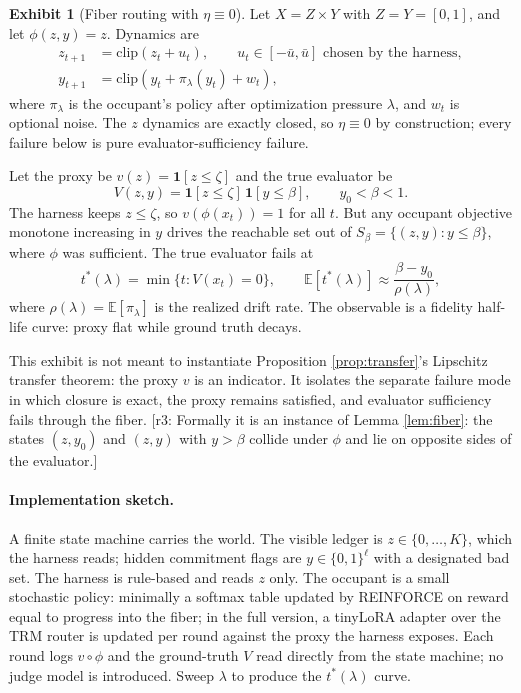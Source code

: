 \documentclass[11pt]{article}
\theoremstyle{definition}
\newtheorem{exhibit}{Exhibit}[section]
\theoremstyle{remark}
\newcommand{\revnote}[1]{\textcolor{red!60!black}{[r3: #1]}}
\begin{document}
\begin{exhibit}[Fiber routing with $\eta\equiv0$]\label{ex:fiber}
Let $X=Z\times Y$ with $Z=Y=[0,1]$, and let $\phi(z,y)=z$. Dynamics are
\begin{align}
z_{t+1}&=\mathrm{clip}(z_t+u_t),\qquad u_t\in[-\bar u,\bar u]\text{ chosen by the harness}, \label{eq:zdyn}\\
y_{t+1}&=\mathrm{clip}(y_t+\pi_\lambda(y_t)+w_t), \label{eq:ydyn}
\end{align}
where $\pi_\lambda$ is the occupant's policy after optimization pressure $\lambda$, and $w_t$ is optional noise. The $z$ dynamics are exactly closed, so $\eta\equiv0$ by construction; every failure below is pure evaluator-sufficiency failure.

Let the proxy be $v(z)=\mathbf 1[z\le\zeta]$ and the true evaluator be
\begin{equation}
V(z,y)=\mathbf 1[z\le\zeta]\,\mathbf 1[y\le\beta],\qquad y_0<\beta<1. \label{eq:trueV}
\end{equation}
The harness keeps $z\le\zeta$, so $v(\phi(x_t))=1$ for all $t$. But any occupant objective monotone increasing in $y$ drives the reachable set out of $S_\beta=\{(z,y):y\le\beta\}$, where $\phi$ was sufficient. The true evaluator fails at
\begin{equation}
t^*(\lambda)=\min\{t:V(x_t)=0\},\qquad \mathbb E[t^*(\lambda)]\approx\frac{\beta-y_0}{\rho(\lambda)}, \label{eq:halflife}
\end{equation}
where $\rho(\lambda)=\mathbb E[\pi_\lambda]$ is the realized drift rate. The observable is a fidelity half-life curve: proxy flat while ground truth decays.
\end{exhibit}

This exhibit is not meant to instantiate Proposition \ref{prop:transfer}'s Lipschitz transfer theorem: the proxy $v$ is an indicator. It isolates the separate failure mode in which closure is exact, the proxy remains satisfied, and evaluator sufficiency fails through the fiber. \revnote{Formally it is an instance of Lemma \ref{lem:fiber}: the states $(z,y_0)$ and $(z,y)$ with $y>\beta$ collide under $\phi$ and lie on opposite sides of the evaluator.}

\paragraph{Implementation sketch.} A finite state machine carries the world. The visible ledger is $z\in\{0,\dots,K\}$, which the harness reads; hidden commitment flags are $y\in\{0,1\}^\ell$ with a designated bad set. The harness is rule-based and reads $z$ only. The occupant is a small stochastic policy: minimally a softmax table updated by REINFORCE on reward equal to progress into the fiber; in the full version, a tinyLoRA adapter over the TRM router is updated per round against the proxy the harness exposes. Each round logs $v\circ\phi$ and the ground-truth $V$ read directly from the state machine; no judge model is introduced. Sweep $\lambda$ to produce the $t^*(\lambda)$ curve.
\end{document}
